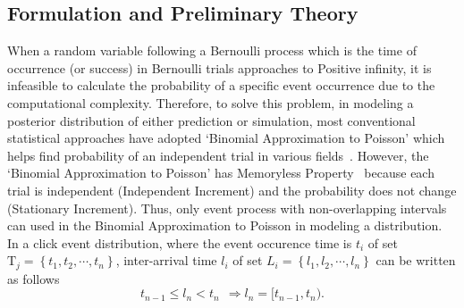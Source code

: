 \documentclass[10pt,letterpaper]{article}
\begin{document}
\subsection*{Formulation and Preliminary Theory}
When a random variable following a Bernoulli process which is the time of occurrence (or success) in Bernoulli trials approaches to Positive infinity, it is infeasible to calculate the probability of a specific event occurrence due to the computational complexity. Therefore, to solve this problem, in modeling a posterior distribution of either prediction or simulation, most conventional statistical approaches have adopted ‘Binomial Approximation to Poisson' which helps find probability of an independent trial in various fields~\cite{bib28, bib29, bib30}. 
However, the ‘Binomial Approximation to Poisson' has Memoryless Property~\cite{bib10} because each trial is independent (Independent Increment) and the probability does not change (Stationary Increment). Thus, only event process with non-overlapping intervals can used in the Binomial Approximation to Poisson in modeling a distribution.\\
In a click event distribution, where the event occurence time is $t_i$ of set $\textrm{T}_j=\left \{{t_1, t_2, \cdots, t_n}  \right \}$, inter-arrival time $l_i$ of set $L_i=\left \{ l_1, l_2, \cdots, l_n \right \}$ can be written as follows 
$$
t_{n-1}\leq l_n<t_n \ \ \Rightarrow l_n=[t_{n-1},t_n).
$$
\end{document}
